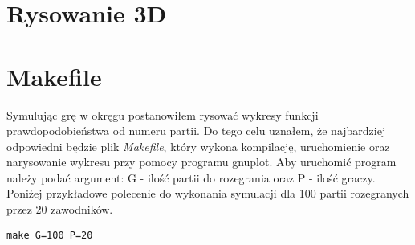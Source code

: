 
\section{Rysowanie 3D}
\label{sec::3d}


\section{Makefile}
\label{sec::makefile}
Symulując grę w okręgu postanowiłem rysować wykresy funkcji prawdopodobieństwa od numeru partii. Do tego celu uznałem, że najbardziej odpowiedni będzie plik \textit{Makefile}, który wykona kompilację, uruchomienie oraz narysowanie wykresu przy pomocy programu gnuplot. Aby uruchomić program należy podać argument: G - ilość partii do rozegrania oraz P - ilość graczy. Poniżej przykładowe polecenie do wykonania symulacji dla 100 partii rozegranych przez 20 zawodników.
\begin{verbatim}
make G=100 P=20
\end{verbatim}
